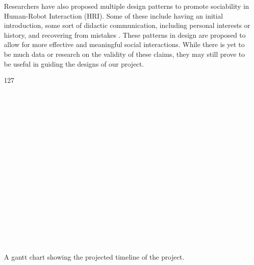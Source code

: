 \documentclass[onecolumn, draftclsnofoot,10pt, compsoc]{IEEEtran}
\begin{document}
Researchers have also proposed multiple design patterns to promote sociability in Human-Robot Interaction (HRI). Some of these include having an initial introduction, some sort of didactic communication, including personal interests or history, and recovering from mistakes \cite{Kahn:2008}. These patterns in design are proposed to allow for more effective and meaningful social interactions. While there is yet to be much data or research on the validity of these claims, they may still prove to be useful in guiding the designs of our project.
\pagebreak
\begin{landscape}

\begin{table}
	\begin{ganttchart}[
		hgrid,
		vgrid=true]{1}{27}

		 \\
		 \\
		 \\
		 \\
		 \\
		 \\
		 \\
		 \\
		 \\
		 \\
		 \\
		 \\
		 \\
		 \\
		 \\
		 \\




	\end{ganttchart}
	\caption{A gantt chart showing the projected timeline of the project.}
	\label{Gantt Chart}

\end{table}

\end{landscape}
\pagebreak
\end{document}
